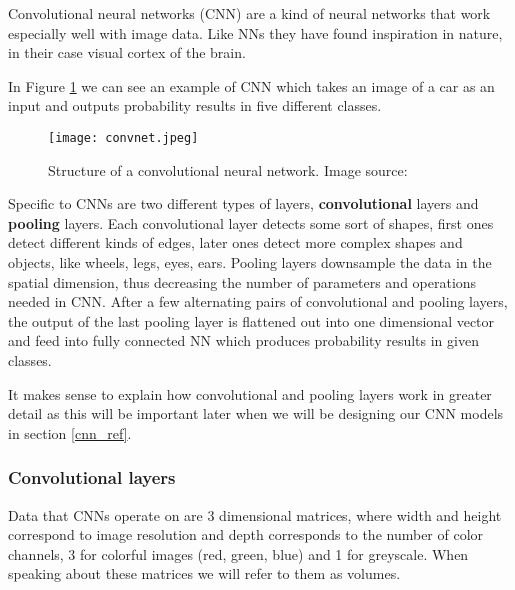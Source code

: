 Convolutional neural networks (CNN) are a kind of neural networks that work especially well with image data.
Like NNs they have found inspiration in nature, in their case visual cortex of the brain.\footnotemark
{}

In Figure \ref{convnet} we can see an example of CNN which takes an image of a car as an input and outputs probability results in five different classes.
\newline

\begin{figure}[ht]
        \centering
        \texttt{[image: convnet.jpeg]} 
        \caption[Structure of a convolutional neural network.]{Structure of a convolutional neural network. Image source:\cite{cs231n}}
        \label{convnet}
\end{figure}

Specific to CNNs are two different types of layers, \textbf{convolutional} layers and \textbf{pooling} layers.
Each convolutional layer detects some sort of shapes, first ones detect different kinds of edges, later ones detect more complex shapes and objects, like wheels, legs, eyes, ears.
Pooling layers downsample the data in the spatial dimension, thus decreasing the number of parameters and operations needed in CNN.
After a few alternating pairs of convolutional and pooling layers, the output of the last pooling layer is flattened out into one dimensional vector and feed into fully connected NN which produces probability results in given classes.

It makes sense to explain how convolutional and pooling layers work in greater detail as this will be important later when we will be designing our CNN models in section \ref{cnn_ref}.


\subsubsection{ Convolutional layers}

Data that CNNs operate on are 3 dimensional matrices, where width and height correspond to image resolution and depth corresponds to the number of color channels, 3 for colorful images (red, green, blue) and 1 for greyscale.
When speaking about these matrices we will refer to them as volumes.

